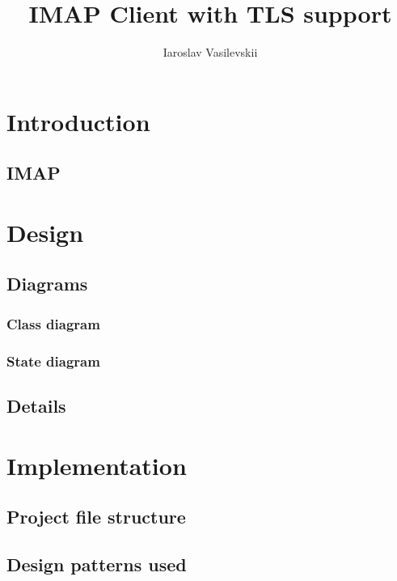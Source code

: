 \documentclass{report}
\title{IMAP Client with TLS support}
\author{Iaroslav Vasilevskii}
\begin{document}
\maketitle
\tableofcontents

\chapter{Introduction}

\section{IMAP}


\chapter{Design}

\section{Diagrams}

\subsection{Class diagram}

\subsection{State diagram}

\section{Details}

\chapter{Implementation}

\section{Project file structure}

\section{Design patterns used}
\end{document}
